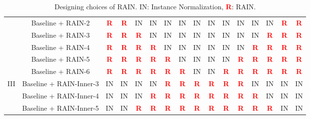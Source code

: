\documentclass[final]{cvpr}
\begin{document}
\begin{table*}[!tp]
\begin{center}
\begin{tabular}{|c|c|c|c|c|c|c|c|c|c|c|c|c|c|c|c|}
& Baseline + RAIN-2 & \textcolor{red}{\textbf{R}} & \textcolor{red}{\textbf{R}} & IN & IN & IN & IN & IN & IN & IN & IN & IN & IN & \textcolor{red}{\textbf{R}} & \textcolor{red}{\textbf{R}} \\
& Baseline + RAIN-3 & \textcolor{red}{\textbf{R}} & \textcolor{red}{\textbf{R}} & \textcolor{red}{\textbf{R}} & IN & IN & IN & IN & IN & IN & IN & IN & \textcolor{red}{\textbf{R}} & \textcolor{red}{\textbf{R}} & \textcolor{red}{\textbf{R}} \\
& Baseline + RAIN-4 & \textcolor{red}{\textbf{R}} & \textcolor{red}{\textbf{R}} & \textcolor{red}{\textbf{R}} & \textcolor{red}{\textbf{R}} & IN & IN & IN & IN & IN & IN & \textcolor{red}{\textbf{R}} & \textcolor{red}{\textbf{R}} & \textcolor{red}{\textbf{R}} & \textcolor{red}{\textbf{R}} \\
& Baseline + RAIN-5 & \textcolor{red}{\textbf{R}} & \textcolor{red}{\textbf{R}} & \textcolor{red}{\textbf{R}} & \textcolor{red}{\textbf{R}} & \textcolor{red}{\textbf{R}} & IN & IN & IN & IN & \textcolor{red}{\textbf{R}} & \textcolor{red}{\textbf{R}} & \textcolor{red}{\textbf{R}} & \textcolor{red}{\textbf{R}} & \textcolor{red}{\textbf{R}} \\
& Baseline + RAIN-6 & \textcolor{red}{\textbf{R}} & \textcolor{red}{\textbf{R}} & \textcolor{red}{\textbf{R}} & \textcolor{red}{\textbf{R}} & \textcolor{red}{\textbf{R}} & \textcolor{red}{\textbf{R}} & IN & IN & \textcolor{red}{\textbf{R}} & \textcolor{red}{\textbf{R}} & \textcolor{red}{\textbf{R}} & \textcolor{red}{\textbf{R}} & \textcolor{red}{\textbf{R}} & \textcolor{red}{\textbf{R}} \\
\hline\hline
\multirow{3}{*}{III}& Baseline + RAIN-Inner-3 & IN & IN & IN & IN & \textcolor{red}{\textbf{R}} & \textcolor{red}{\textbf{R}} & \textcolor{red}{\textbf{R}} & \textcolor{red}{\textbf{R}} & \textcolor{red}{\textbf{R}} & \textcolor{red}{\textbf{R}} & IN & IN & IN & IN\\
& Baseline + RAIN-Inner-4 & IN & IN & IN & \textcolor{red}{\textbf{R}} & \textcolor{red}{\textbf{R}} & \textcolor{red}{\textbf{R}} & \textcolor{red}{\textbf{R}} & \textcolor{red}{\textbf{R}} & \textcolor{red}{\textbf{R}} & \textcolor{red}{\textbf{R}} & \textcolor{red}{\textbf{R}} & IN & IN & IN\\
& Baseline + RAIN-Inner-5 & IN & IN & \textcolor{red}{\textbf{R}} & \textcolor{red}{\textbf{R}} & \textcolor{red}{\textbf{R}} & \textcolor{red}{\textbf{R}} & \textcolor{red}{\textbf{R}} & \textcolor{red}{\textbf{R}} & \textcolor{red}{\textbf{R}} & \textcolor{red}{\textbf{R}} & \textcolor{red}{\textbf{R}} & \textcolor{red}{\textbf{R}} & IN & IN\\
\hline
\end{tabular}
\end{center}
\caption{Designing choices of RAIN. IN: Instance Normalization, \textcolor{red}{\textbf{R}}: RAIN. }
\label{tab:applying_choice_of_RAIN}
\end{table*}
\end{document}
